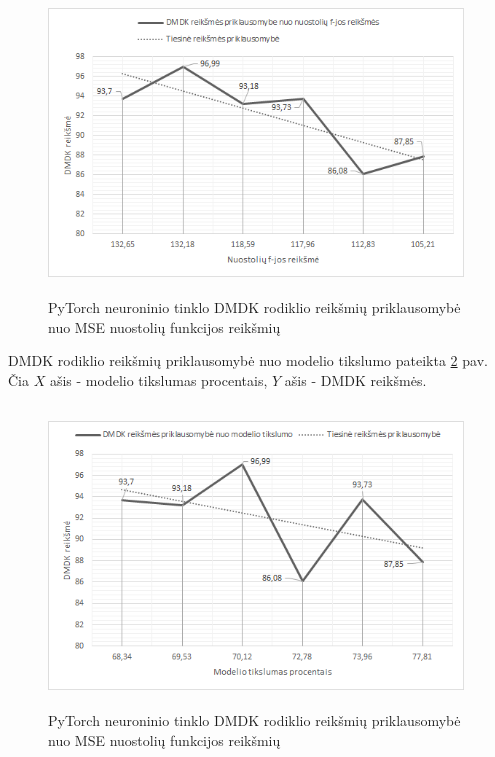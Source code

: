 \documentclass{VUMIFInfBakalaurinis}
\begin{document}
\begin{figure}[h]
  \centering
  \includegraphics[width=11cm,height=8cm,keepaspectratio]{img/pap_tyr_1.png}
  \caption{PyTorch neuroninio tinklo DMDK rodiklio reikšmių priklausomybė nuo MSE nuostolių funkcijos reikšmių}
  \label{fig:PyTorch neuroninio tinklo DMDK rodiklio reikšmių priklausomybė nuo MSE nuostolių funkcijos reikšmių}
\end{figure}

\par DMDK rodiklio reikšmių priklausomybė nuo modelio tikslumo pateikta \ref{fig:PyTorch neuroninio tinklo DMDK rodiklio reikšmių priklausomybė nuo MSE nuostolių funkcijos reikšmių} pav. Čia $X$ ašis - modelio tikslumas procentais, $Y$ ašis - DMDK reikšmės.

\begin{figure}[h]
  \centering
  \includegraphics[width=11cm,height=8cm,keepaspectratio]{img/pap_tyr_2.png}
  \caption{PyTorch neuroninio tinklo DMDK rodiklio reikšmių priklausomybė nuo MSE nuostolių funkcijos reikšmių}
  \label{fig:PyTorch neuroninio tinklo DMDK rodiklio reikšmių priklausomybė nuo MSE nuostolių funkcijos reikšmių}
\end{figure}
\end{document}
